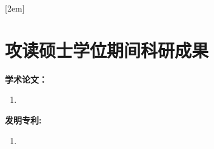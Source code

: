 
[2em]{\vspace{.5\baselineskip}\xiaosan\song}%
             {\prechaptername\CJKnumber{\thecontentslabel}\postchaptername\qquad}{} %
             {}             %
\chapter*{攻读硕士学位期间科研成果}

\noindent
\textbf{学术论文：}
\begin{enumerate}
\item

\end{enumerate}

\noindent
\textbf{发明专利:}
\begin{enumerate}
\item

\end{enumerate}


\thispagestyle{empty}

